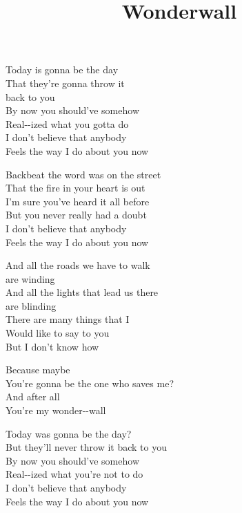 \title{Wonderwall} 

\begin{enumerate}
\intro {}      

\verse {} Today is  gonna be the day \\ 
That they’re  gonna throw it \\ 
back to  you \\ 
 By now you  should’ve somehow \\ 
Real--ized what you gotta  do \\ 
 I don’t believe that  anybody \\ 
 Feels the way I  do about you  now  

\verse {} Backbeat the  word was on the street \\ 
That the  fire in your heart is  out \\ 
 I’m sure you’ve  heard it all before \\ 
But you  never really had a  doubt \\ 
 I don’t believe that  anybody \\ 
 Feels the way I  do about you  now  



 And  all the roads we  have to walk \\ 
are  winding \\ 
And  all the lights that  lead us there \\ 
are  blinding \\ 
 There are many  things that I \\ 
Would  like to  say to  you \\ 
But I  don’t know  how

 Because  maybe   \\ 
 You’re gonna be the one who  saves me?   \\ 
And  after  all  \\ 
 You’re my  wonder--wall    

\verse {} Today was  gonna be the day? \\ 
But they’ll never  throw it back to  you \\ 
 By now you  should’ve somehow \\ 
Real--ized what you’re not to  do \\ 
 I don’t believe that  anybody \\ 
 Feels the way I  do about you  now  


\end{enumerate}
